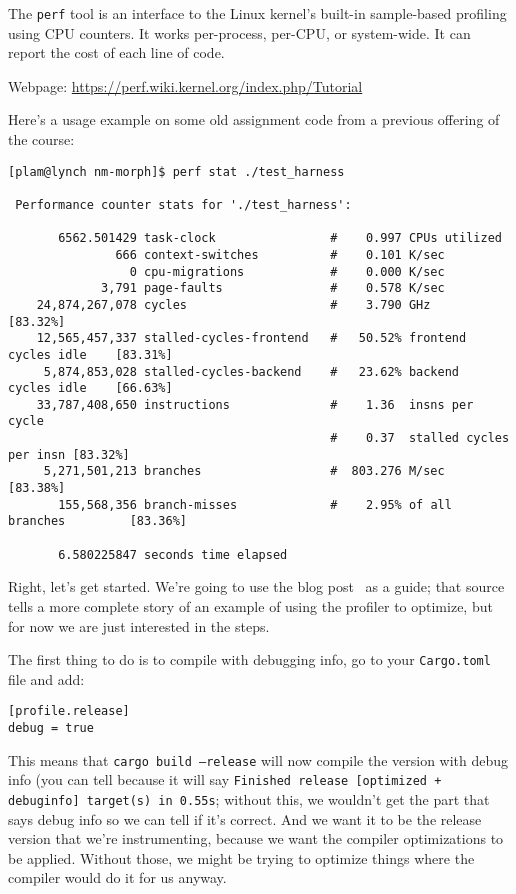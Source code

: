 The \texttt{perf} tool is an interface to the Linux kernel's built-in
sample-based profiling using CPU counters. It works per-process, per-CPU, or system-wide. It can report the cost of each line of code.

Webpage: \url{https://perf.wiki.kernel.org/index.php/Tutorial}

\noindent
Here's a usage example on some old assignment code from a previous offering of the course:
\begin{lstlisting}[basicstyle=\scriptsize]
[plam@lynch nm-morph]$ perf stat ./test_harness

 Performance counter stats for './test_harness':

       6562.501429 task-clock                #    0.997 CPUs utilized          
               666 context-switches          #    0.101 K/sec                  
                 0 cpu-migrations            #    0.000 K/sec                  
             3,791 page-faults               #    0.578 K/sec                  
    24,874,267,078 cycles                    #    3.790 GHz                     [83.32%]
    12,565,457,337 stalled-cycles-frontend   #   50.52% frontend cycles idle    [83.31%]
     5,874,853,028 stalled-cycles-backend    #   23.62% backend  cycles idle    [66.63%]
    33,787,408,650 instructions              #    1.36  insns per cycle        
                                             #    0.37  stalled cycles per insn [83.32%]
     5,271,501,213 branches                  #  803.276 M/sec                   [83.38%]
       155,568,356 branch-misses             #    2.95% of all branches         [83.36%]

       6.580225847 seconds time elapsed
\end{lstlisting} %

Right, let's get started. We're going to use the blog post~\cite{rustflamegraph} as a guide; that source tells a more complete story of an example of using the profiler to optimize, but for now we are just interested in the steps.

The first thing to do is to compile with debugging info, go to your \texttt{Cargo.toml} file and add:
\begin{verbatim}
[profile.release]
debug = true
\end{verbatim}

This means that \texttt{cargo build --release} will now compile the version with debug info (you can tell because it will say \texttt{Finished release [optimized + debuginfo] target(s) in 0.55s}; without this, we wouldn't get the part that says debug info so we can tell if it's correct. And we want it to be the release version that we're instrumenting, because we want the compiler optimizations to be applied. Without those, we might be trying to optimize things where the compiler would do it for us anyway.

